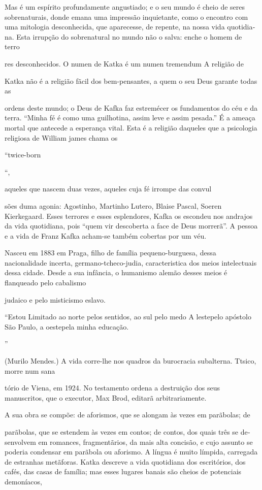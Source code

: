 Mas é um espírito profundamente angustiado; e o seu mundo é cheio de
seres sobrenaturais, donde emana uma impressão inquietante, como o
encontro com uma mitologia desconhecida, que aparecesse, de repente, na
nossa vida quotidia­ na. Esta irrupção do sobrenatural no mundo não o
salva: enche o homem de terro­

res desconhecidos. O numen de Katka é um numen tremendum A religião de

Katka não é a religião fãcil dos bem-pensantes, a quem o seu Deus
garante todas as

ordens deste mundo; o Deus de Kafka faz estremécer os fundamentos do céu
e da terra. ``Minha fé é como uma guilhotina, assim leve e assim
pesada.'' É a ameaça mortal que antecede a esperança vital. Esta é a
religião daqueles que a psicologia religiosa de William james chama os

``twice-born

``,

aqueles que nascem duas vezes, aqueles cuja fé irrompe das convul­

sões duma agonia: Agostinho, Martinho Lutero, Blaise Pascal, Soeren
Kierkegaard. Esses terrores e esses esplendores, Kafka os escondeu nos
andrajos da vida quotidiana, pois ``quem vir descoberta a face de Deus
morrerã''. A pessoa e a vida de Franz Kafka acham-se também cobertas por
um véu.

Nasceu em 1883 em Praga, filho de família pequeno-burguesa, dessa
nacionalidade incerta, germano-tcheco-judia, caracteristica dos meios
intelectuais dessa cidade. Desde a sua infância, o humanismo alemão
desses meios é flanqueado pelo cabalismo

judaico e pelo misticismo eslavo.

``Estou Limitado ao norte pelos sentidos, ao sul pelo medo A lestepelo
apóstolo São Paulo, a oestepela minha educação.

''

(Murilo Mendes.) A vida corre-lhe nos quadros da burocracia subalterna.
Ttsico, morre num sana­

tório de Viena, em 1924. No testamento ordena a destruição dos seus
manuscritos, que o executor, Max Brod, editarã arbitrariamente.

A sua obra se compõe: de aforismos, que se alongam às vezes em
parãbolas; de

parãbolas, que se estendem às vezes em contos; de contos, dos quais três
se de­ senvolvem em romances, fragmentãrios, da mais alta concisão, e
cujo assunto se poderia condensar em parãbola ou aforismo. A língua é
muito límpida, carregada de estranhas metãforas. Katka descreve a vida
quotidiana dos escritórios, dos cafés, das casas de família; mas esses
lugares banais são cheios de potenciais demoníacos,

